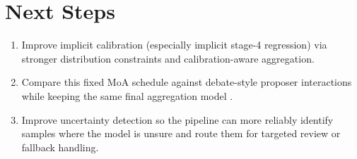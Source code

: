 \section{Next Steps}
\begin{enumerate}
  \item Improve implicit calibration (especially implicit stage-4 regression) via stronger distribution constraints and calibration-aware aggregation.
  \item Compare this fixed MoA schedule against debate-style proposer interactions while keeping the same final aggregation model \cite{du2023multiagentdebate}.
  \item Improve uncertainty detection so the pipeline can more reliably identify samples where the model is unsure and route them for targeted review or fallback handling.
\end{enumerate}



